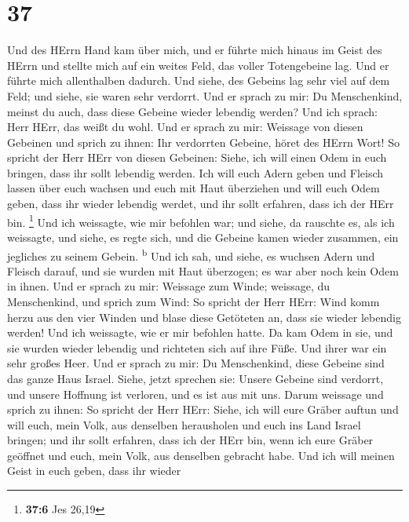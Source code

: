 \hypertarget{section-36}{%
\section{37}\label{section-36}}

 Und des HErrn Hand kam über mich, und er führte mich
hinaus im Geist des HErrn und stellte mich auf ein weites Feld, das
voller Totengebeine lag.  Und er führte mich allenthalben
dadurch. Und siehe, des Gebeins lag sehr viel auf dem Feld; und siehe,
sie waren sehr verdorrt.  Und er sprach zu mir: Du
Menschenkind, meinst du auch, dass diese Gebeine wieder lebendig werden?
Und ich sprach: Herr HErr, das weißt du wohl.  Und er
sprach zu mir: Weissage von diesen Gebeinen und sprich zu ihnen: Ihr
verdorrten Gebeine, höret des HErrn Wort!  So spricht der
Herr HErr von diesen Gebeinen: Siehe, ich will einen Odem in euch
bringen, dass ihr sollt lebendig werden.  Ich will euch
Adern geben und Fleisch lassen über euch wachsen und euch mit Haut
überziehen und will euch Odem geben, dass ihr wieder lebendig werdet,
und ihr sollt erfahren, dass ich der HErr bin. \footnote{\textbf{37:6}
  Jes 26,19}  Und ich weissagte, wie mir befohlen war; und
siehe, da rauschte es, als ich weissagte, und siehe, es regte sich, und
die Gebeine kamen wieder zusammen, ein jegliches zu seinem Gebein.
\textsuperscript{b}  Und ich sah, und siehe, es wuchsen
Adern und Fleisch darauf, und sie wurden mit Haut überzogen; es war aber
noch kein Odem in ihnen.  Und er sprach zu mir: Weissage
zum Winde; weissage, du Menschenkind, und sprich zum Wind: So spricht
der Herr HErr: Wind komm herzu aus den vier Winden und blase diese
Getöteten an, dass sie wieder lebendig werden!  Und ich
weissagte, wie er mir befohlen hatte. Da kam Odem in sie, und sie wurden
wieder lebendig und richteten sich auf ihre Füße. Und ihrer war ein sehr
großes Heer.  Und er sprach zu mir: Du Menschenkind,
diese Gebeine sind das ganze Haus Israel. Siehe, jetzt sprechen sie:
Unsere Gebeine sind verdorrt, und unsere Hoffnung ist verloren, und es
ist aus mit uns.  Darum weissage und sprich zu ihnen: So
spricht der Herr HErr: Siehe, ich will eure Gräber auftun und will euch,
mein Volk, aus denselben herausholen und euch ins Land Israel bringen;
 und ihr sollt erfahren, dass ich der HErr bin, wenn ich
eure Gräber geöffnet und euch, mein Volk, aus denselben gebracht habe.
 Und ich will meinen Geist in euch geben, dass ihr wieder
